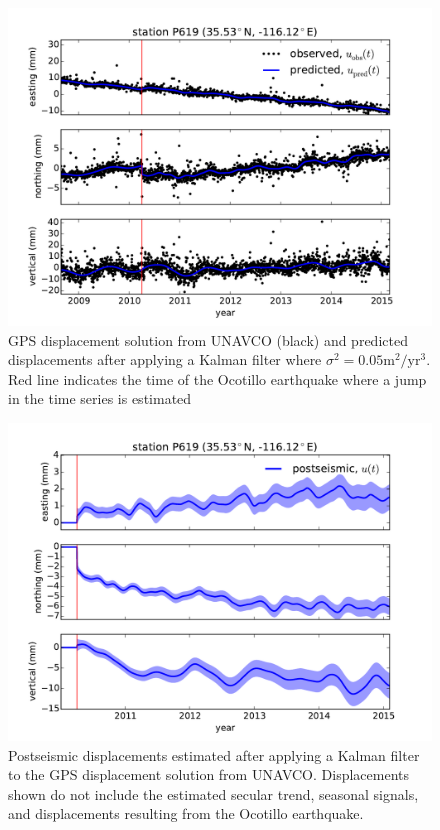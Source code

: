 \documentclass[12pt]{article}
\begin{document}
\begin{figure}
\includegraphics[scale=0.6]{Figures/figure_3}
\centering
\caption{GPS displacement solution from UNAVCO (black) and predicted displacements after applying a Kalman filter where $\sigma^2=0.05 \mathrm{m}^2/\mathrm{yr}^3$. Red line indicates the time of the Ocotillo earthquake where a jump in the time series is estimated}
\label{P619Fit}
\end{figure}

\begin{figure}

\includegraphics[scale=0.6]{Figures/figure_4}
\centering
\caption{Postseismic displacements estimated after applying a Kalman filter to the GPS displacement solution from UNAVCO.  Displacements shown do not include the estimated secular trend, seasonal signals, and displacements resulting from the Ocotillo earthquake.} 
\label{P619PS}
\end{figure}
\end{document}
